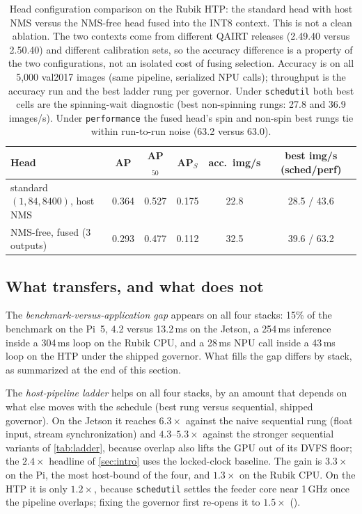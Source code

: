 \begin{table}[t]
\centering
\caption{Head configuration comparison on the Rubik HTP: the standard
head with host NMS versus the NMS-free head fused into the INT8
context. This is not a clean ablation. The two contexts come from
different QAIRT releases (2.49.40 versus 2.50.40) and different
calibration sets, so the accuracy difference is a property of the
two configurations, not an isolated cost of fusing selection.
Accuracy is on all 5,000 val2017 images (same pipeline, serialized NPU
calls); throughput is the accuracy run and the best ladder rung per
governor. Under \texttt{schedutil} both best cells are the
spinning-wait diagnostic (best non-spinning rungs: 27.8 and 36.9
images/s). Under \texttt{performance} the fused head's spin and
non-spin best rungs tie within run-to-run noise (63.2 versus 63.0).}
\label{tab:rubikhtpe2e}
\small
\begin{tabular}{@{}lccccc@{}}
\toprule
Head & AP & AP$_{50}$ & AP$_S$ & acc.\ img/s & best img/s (sched/perf) \\
\midrule
standard $(1{,}84{,}8400)$, host NMS & 0.364 & 0.527 & 0.175 & 22.8 & 28.5 / 43.6 \\
NMS-free, fused (3 outputs)        & 0.293 & 0.477 & 0.112 & 32.5 & 39.6 / 63.2 \\
\bottomrule
\end{tabular}
\end{table}

\subsection{What transfers, and what does not}
\label{sec:transfer}

The \emph{benchmark-versus-application gap} appears on all four
stacks: 15\% of the benchmark on the Pi~5, 4.2 versus 13.2\,ms on the
Jetson, a 254\,ms inference inside a 304\,ms loop on the Rubik CPU,
and a 28\,ms NPU call inside a 43\,ms loop on the HTP under the
shipped governor. What fills the gap differs by stack, as summarized at the end of this
section.

The \emph{host-pipeline ladder} helps on all four stacks, by an amount
that depends on what else moves with the schedule (best rung versus
sequential, shipped governor). On the Jetson it
reaches $6.3\times$ against the naive sequential rung (float input,
stream synchronization) and $4.3$--$5.3\times$ against the stronger
sequential variants of \cref{tab:ladder}, because overlap also lifts
the GPU out of its DVFS floor; the $2.4\times$ headline of
\cref{sec:intro} uses the locked-clock baseline. The gain is
$3.3\times$ on the Pi, the most host-bound of the four, and
$1.3\times$ on the Rubik CPU. On the HTP it is only $1.2\times$,
because \texttt{schedutil} settles the feeder core near 1\,GHz once the
pipeline overlaps; fixing the governor first re-opens it to
$1.5\times$ ().

